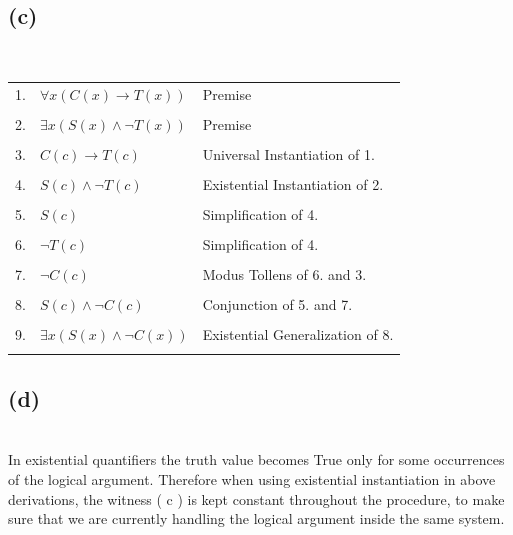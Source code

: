 \documentclass[a4paper,12pt]{article}
\begin{document}
\subsection{(c)}
\,\\
\begin{tabular}{rll}
    1. & $\forall x(C(x) \rightarrow T(x))$ & Premise\\\\
    2. & $\exists x(S(x) \land \neg T(x))$ & Premise\\\\
    3. & $C(c) \rightarrow T(c)$ & Universal Instantiation of 1.\\\\
    4. & $S(c) \land \neg T(c)$ & Existential Instantiation of 2.\\\\
    5. & $S(c)$ & Simplification of 4.\\\\
    6. & $\neg T(c)$ & Simplification of 4.\\\\
    7. & $\neg C(c)$ & Modus Tollens of 6. and 3.\\\\
    8. & $S(c) \land \neg C(c)$ & Conjunction of 5. and 7.\\\\
    9. & $\exists x (S(x) \land \neg C(x))$ & Existential Generalization of 8.\\\\
\end{tabular}

\subsection{(d)}
\,\\
In existential quantifiers the truth value becomes True only for some occurrences of the logical argument. Therefore when using existential instantiation in above derivations, the witness ( c ) is kept constant throughout the procedure, to make sure that we are currently handling the logical argument inside the same system.
\end{document}
